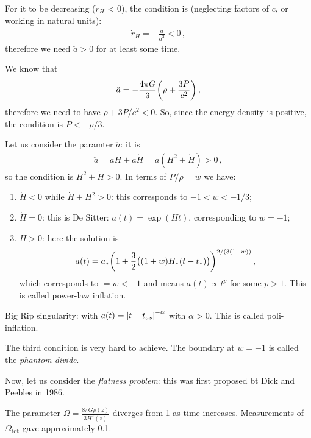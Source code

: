 \documentclass[main.tex]{subfiles}
\begin{document}
For it to be decreasing (\(\dot{r}_H\) < 0), the condition is (neglecting factors of \(c\), or working in natural units):
%
\begin{align}
  \dot{r}_H = - \frac{ \ddot{a} }{\dot{a}^2} <0
\,,
\end{align}
%
therefore we need \(\ddot{a} >0\) for at least some time.

We know that 
%
\begin{align}
  \ddot{a} = -\frac{4 \pi G }{3} \qty(\rho + \frac{3P}{c^2})
\,,
\end{align}
%
therefore we need to have \(\rho + 3P/c^2 <0\).
So, since the energy density is positive, the condition is \(P < - \rho /3\).

Let us consider the paramter \(\ddot{a}\): it is 
%
\begin{align}
  \ddot{a} = \dot{a}H + a \dot{H} = a (H^2 + \dot{H})>0
\,,
\end{align}
%
so the condition is \(H^2+ \dot{H} >0\). In terms of \(P/ \rho = w\) we have:

\begin{enumerate}
    \item \(\dot{H} < 0\) while \(\dot{H} + H^2 >0\): this corresponds to \(-1 < w < -1/3\);
    \item \(\dot{H} =0\): this is De Sitter: \(a(t) = \exp(Ht) \), corresponding to \(w = -1\);
    \item \(\dot{H} >0\): here the solution is 
    \begin{align}
      a(t) = a_{*} \qty(1 + \frac{3}{2}\qty((1+w)H_{*}\qty(t-t_{*})))^{2/ (3(1+w))}
    \,,
    \end{align}
    which corresponds to \(= w<-1\) and means \(a(t) \propto t^{p}\) for some \(p>1\). This is called power-law inflation.
\end{enumerate}

Big Rip singularity: with \(a(t) = \abs{t - t_{as}}^{- \alpha } \) with \(\alpha >0\). This is called poli-inflation.


The third condition is very hard to achieve.
The boundary at \(w = -1\) is called the \emph{phantom divide}.

Now, let us consider the \emph{flatness problem}:
this was first proposed bt Dick and Peebles in 1986.

The parameter \(\Omega = \frac{8 \pi G \rho(z) }{3 H^2(z)} \) diverges from 1 as time increases.
Measurements of \(\Omega _{\text{tot}}\) gave approximately 0.1.
\end{document}
